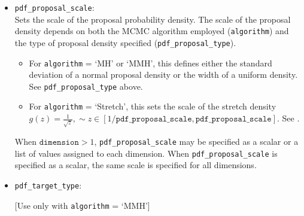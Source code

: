 \documentclass[./UsersGuide.tex]{subfiles}
\begin{document}
\begin{itemize}
\item \texttt{pdf\_proposal\_scale}:\\ 
	Sets the scale of the proposal probability density. The scale of the proposal density depends on both the MCMC algorithm employed (\texttt{algorithm}) and the type of proposal 		density specified (\texttt{pdf\_proposal\_type}).
	\begin{itemize}
		\item For \texttt{algorithm} = `MH' or `MMH', this defines either the standard deviation of a normal proposal density or the width of a uniform density. See 							\texttt{pdf\_proposal\_type} above.
		\item For \texttt{algorithm} = `Stretch', this sets the scale of the stretch density $g(z)=\frac{1}{\sqrt{z}},\sim z\in[1/\texttt{pdf\_proposal\_scale}, \texttt{pdf\_proposal\_scale}]$. See 		\cite{Goodman2010}.
	\end{itemize}
	When $\texttt{dimension}>1$, \texttt{pdf\_proposal\_scale} may be specified as a scalar or a list of values assigned to each dimension. When \texttt{pdf\_proposal\_scale} is specified 	as a scalar, the same scale is specified for all dimensions. 
\item \texttt{pdf\_target\_type}: 

	[Use only with \texttt{algorithm} = `MMH']\\ 
	

\end{itemize}
\end{document}
